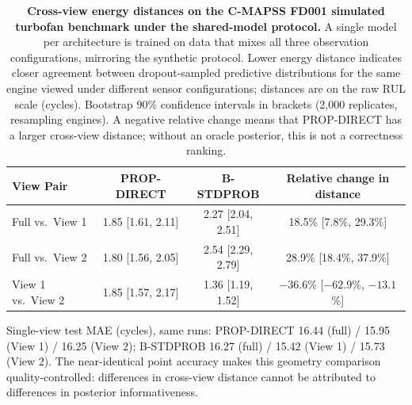 \begin{table}[t]
\centering
\begin{threeparttable}
\caption{\textbf{Cross-view energy distances on the C-MAPSS FD001 simulated
turbofan benchmark under the shared-model protocol.} A single model per
architecture is trained on data that mixes all three observation
configurations, mirroring the synthetic protocol. Lower energy distance
indicates closer agreement between dropout-sampled predictive distributions
for the same engine viewed under different sensor configurations; distances
are on the raw RUL scale (cycles). Bootstrap 90\% confidence intervals in
brackets (2,000 replicates, resampling engines). A negative relative change
means that PROP-DIRECT has a larger cross-view distance; without an oracle posterior,
this is not a correctness ranking.}
\label{tab:cmapss_validation}
\begin{tabular}{lccc}
\toprule
\textbf{View Pair} & \textbf{PROP-DIRECT} & \textbf{B-STDPROB} & \textbf{Relative change in distance} \\
\midrule
Full vs.\ View 1    & 1.85 [1.61, 2.11] & 2.27 [2.04, 2.51] & 18.5\% [7.8\%, 29.3\%] \\
Full vs.\ View 2    & 1.80 [1.56, 2.05] & 2.54 [2.29, 2.79] & 28.9\% [18.4\%, 37.9\%] \\
View 1 vs.\ View 2  & 1.85 [1.57, 2.17] & 1.36 [1.19, 1.52] & $-36.6$\% [$-62.9$\%, $-13.1$\%] \\
\bottomrule
\end{tabular}
\begin{tablenotes}
\footnotesize
\item Single-view test MAE (cycles), same runs: PROP-DIRECT 16.44 (full) /
15.95 (View 1) / 16.25 (View 2); B-STDPROB 16.27 (full) / 15.42 (View 1) /
15.73 (View 2). The near-identical point accuracy makes this geometry
comparison quality-controlled: differences in cross-view distance cannot be
attributed to differences in posterior informativeness.
\end{tablenotes}
\end{threeparttable}
\end{table}
